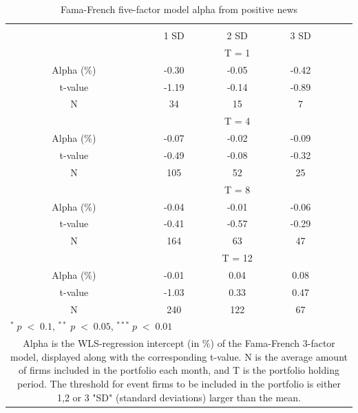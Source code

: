\setlength{\tabcolsep}{15pt}
\begin{table}[]
\small
\centering
\caption{Fama-French five-factor model alpha from positive news } 
\begin{tabular}{ccccccc}
\hline \hline \\ 
 &     &  &    1 SD  &  2 SD  &  3 SD  &  \\ \cline{4-6} 
& & & \multicolumn{3}{c}{ T = 1} & \\ \cline{2-6}
& Alpha (\%)  &  & -0.30  & -0.05  & -0.42 &  \\
& t-value &  & -1.19 & -0.14  & -0.89 & \\
&  N       &  &  34    & 15 & 7 &\\
& & & \multicolumn{3}{c}{ T = 4} & \\ \cline{2-6}
& Alpha (\%)  &  & -0.07  & -0.02  &  -0.09 & \\
& t-value &  & -0.49 & -0.08  & -0.32 & \\
& N       &  & 105     & 52  & 25 & \\
& & & \multicolumn{3}{c}{ T = 8} & \\ \cline{2-6}
& Alpha (\%)  &  & -0.04   & -0.01  & -0.06 &  \\
& t-value &  & -0.41  & -0.57 & -0.29 & \\
& N       &  & 164 & 63   & 47 & \\
&  & & \multicolumn{3}{c}{ T = 12} & \\ \cline{2-6}
& Alpha (\%)  &  & -0.01  & 0.04  & 0.08 &  \\
& t-value &  & -1.03  & 0.33 & 0.47 & \\
& N       &  & 240    & 122  & 67 & \\ \hline \hline
 \multicolumn{7}{l}{ \footnotesize $^* \; p\; <\; 0.1$, $ ^{**} \; p\; <\; 0.05$, $ ^{***} \; p\; <\; 0.01$  } \\
 \multicolumn{7}{p{11.5cm}}{ \footnotesize Alpha is the WLS-regression intercept (in \%) of the Fama-French 3-factor model, displayed along with the corresponding t-value. N is the average amount of firms included in the portfolio each month, and T is the portfolio holding period. The threshold for event firms to be included in the portfolio is either 1,2 or 3 "SD" (standard deviations) larger than the mean.}  \\ 
\end{tabular}
\label{tab: FF3-pos}
\end{table}

